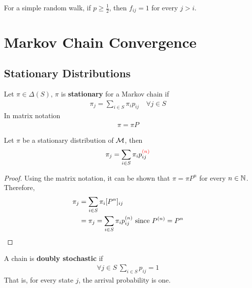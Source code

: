 \documentclass{article}
\newcommand{\upn}[0]{^{(n)}}
\begin{document}
    \begin{proposition}
    	For a simple random walk, if $p \geq \frac{1}{2}$, then $f_{ij} = 1$ for every $j > i$.
    \end{proposition}
    
    \section{Markov Chain Convergence}
    \subsection{Stationary Distributions}
    \begin{definition}
    	Let $\pi \in \Delta(S)$, $\pi$ is \textbf{stationary} for a Markov chain if
    	\begin{align}
    		\pi_j = \sum_{i \in S} \pi_i p_{ij}\quad \forall j \in S
    	\end{align}
    	In matrix notation
    	\begin{align}
    		\pi = \pi P
    	\end{align}
    \end{definition}
    
    \begin{proposition}
    	Let $\pi$ be a stationary distribution of $\mathcal{{M}}$, then 
    	\begin{align}
    		\pi_j = \sum_{i \in S} \pi_i p_{ij}^{\textcolor{red}{(n)}}
    	\end{align}
    \end{proposition}
    
    \begin{proof}
    	Using the matrix notation, it can be shown that $\pi = \pi P^n$ for every $n \in \mathbb{N}$. Therefore,
    	\begin{align}
    		\pi_j &= \sum_{i \in S} \pi_i [P^n]_{ij} \\
    		&= \pi_j = \sum_{i \in S} \pi_i p_{ij}\upn \tx{ since } P\upn = P^n
    	\end{align}
    \end{proof}
    
    \begin{definition}
    	A chain is \textbf{doubly stochastic} if
    	\begin{align}
    		\forall j \in S\ \sum_{i \in S} p_{ij} = 1
    	\end{align}
    	That is, for every state $j$, the arrival probability is one.
    \end{definition}
    
\end{document}
